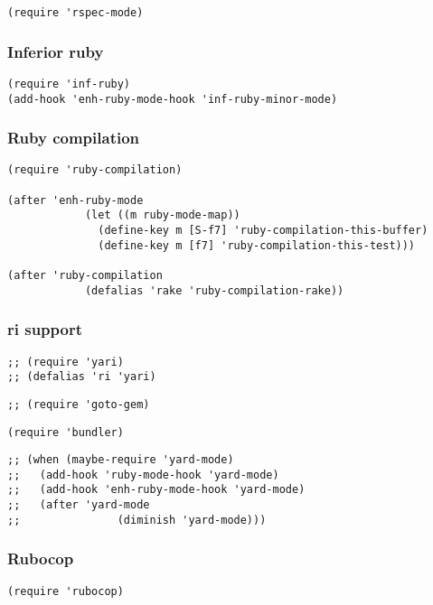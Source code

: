 \documentclass[11pt]{article}
\begin{document}
\begin{verbatim}
(require 'rspec-mode)
\end{verbatim}

\subsubsection*{Inferior ruby}
\label{sec:orgb7e83a7}
\begin{verbatim}
(require 'inf-ruby)
(add-hook 'enh-ruby-mode-hook 'inf-ruby-minor-mode)
\end{verbatim}

\subsubsection*{Ruby compilation}
\label{sec:orgab7d8cb}
\begin{verbatim}
(require 'ruby-compilation)

(after 'enh-ruby-mode
            (let ((m ruby-mode-map))
              (define-key m [S-f7] 'ruby-compilation-this-buffer)
              (define-key m [f7] 'ruby-compilation-this-test)))

(after 'ruby-compilation
            (defalias 'rake 'ruby-compilation-rake))
\end{verbatim}

\subsubsection*{ri support}
\label{sec:org87abdee}
\begin{verbatim}
;; (require 'yari)
;; (defalias 'ri 'yari)
\end{verbatim}



\begin{verbatim}
;; (require 'goto-gem)
\end{verbatim}


\begin{verbatim}
(require 'bundler)
\end{verbatim}


\begin{verbatim}
;; (when (maybe-require 'yard-mode)
;;   (add-hook 'ruby-mode-hook 'yard-mode)
;;   (add-hook 'enh-ruby-mode-hook 'yard-mode)
;;   (after 'yard-mode
;;               (diminish 'yard-mode)))
\end{verbatim}

\subsubsection*{Rubocop}
\label{sec:org3766029}
\begin{verbatim}
(require 'rubocop)
\end{verbatim}
\end{document}
